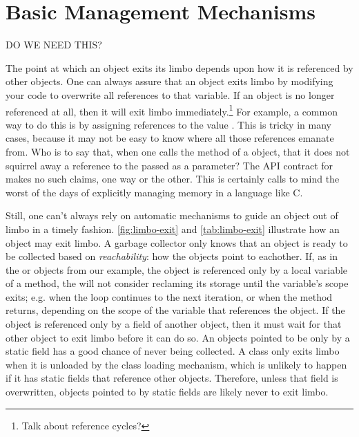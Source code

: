 \section{Basic Management Mechanisms}
DO WE NEED THIS?

The point at which an object exits its limbo depends upon how it is referenced by
other objects. One can always assure that an object exits limbo by modifying your
code to overwrite all references to that variable. If an object is no longer
referenced at all, then it will exit limbo immediately.\footnote{Talk about
reference cycles?} For example, a common way to do this is by assigning
references to the value . This is tricky in many cases, because it may not be easy to
know where all those references emanate from. Who is to say that, when one calls
the  method of a  object, that it does not
squirrel away a reference to the  passed as a parameter? The
API contract for  makes no such claims, one way or the other. This is
certainly calls to mind the worst of the days of explicitly managing memory in a
language like C.


Still, one can't always rely on automatic mechanisms to guide an object out of
limbo in a timely fashion.
\autoref{fig:limbo-exit} and \autoref{tab:limbo-exit}
illustrate how an object may exit limbo. 
A garbage collector only knows that an object is ready to
be collected based on {\em reachability}: how the objects point to eachother.
If, as in the 
or  objects from our example, the object is referenced
only by a local variable of a method, the \jre will not consider reclaming its
storage until the variable's scope exits; e.g. when the loop continues to the
next iteration, or when the method returns, depending on the scope of the
variable that references the object. If the object is referenced only by a
field of another object, then it must wait for that other object to exit limbo
before it can do so. 
An objects pointed to be only by a static field has a good chance of never
being collected. A class only exits limbo when it is unloaded by the \jres
class loading mechanism, which is unlikely to happen if it has static fields
that reference other objects. Therefore, unless that field is overwritten,
objects pointed to by static fields are likely never to exit limbo.